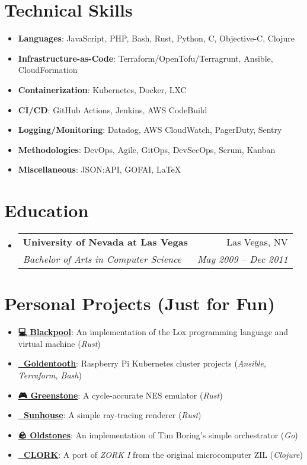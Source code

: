 \documentclass[letterpaper,11pt]{article}
\makeatletter
\newcommand{\resumeSubheading}[4]{
  \vspace{-2pt}\item
    \begin{tabular*}{0.97\textwidth}[t]{l@{\extracolsep{\fill}}r}
      \textbf{#1} & #2 \\
      \textit{\small#3} & \textit{\small #4} \\
    \end{tabular*}\vspace{-7pt}
}
\newcommand{\resumeSubHeadingListStart}{\begin{itemize}[leftmargin=0.15in, label={}]}
\newcommand{\resumeSubHeadingListEnd}{\end{itemize}}
\newenvironment{resumeListicle}{
    \small        %
    \setlength{\itemsep}{0pt}
    \setlength{\parskip}{0pt}
}{}
\newcommand{\resumeListicleStart}{\begin{resumeListicle}}
\newcommand{\resumeListicleEnd}{\end{resumeListicle}}
\newcommand{\resumeListicleItem}[2]{%
  \item \textbf{#1}: #2%
}
\newcommand{\resumeSideProjectListicleItem}[4]{%
  \item \textbf{\href{#1}{#2}}: #3 (\emph{#4})%
}
\makeatother
\begin{document}
\section{Technical Skills}
  \resumeSubHeadingListStart
    \resumeListicleStart
      \resumeListicleItem{Languages}{JavaScript, PHP, Bash, Rust, Python, C, Objective-C, Clojure } \\
      \resumeListicleItem{Infrastructure-as-Code}{Terraform/OpenTofu/Terragrunt, Ansible, CloudFormation } \\
      \resumeListicleItem{Containerization}{Kubernetes, Docker, LXC } \\
      \resumeListicleItem{CI/CD}{GitHub Actions, Jenkins, AWS CodeBuild } \\
      \resumeListicleItem{Logging/Monitoring}{Datadog, AWS CloudWatch, PagerDuty, Sentry } \\
      \resumeListicleItem{Methodologies}{DevOps, Agile, GitOps, DevSecOps, Scrum, Kanban } \\
      \resumeListicleItem{Miscellaneous}{JSON:API, GOFAI, \LaTeX{} } \\
    \resumeListicleEnd
  \resumeSubHeadingListEnd

\section{Education}
  \resumeSubHeadingListStart
    \resumeSubheading
      {University of Nevada at Las Vegas}{Las Vegas, NV}
      {Bachelor of Arts in Computer Science}{May 2009 – Dec 2011}
  \resumeSubHeadingListEnd

\section{Personal Projects (Just for Fun)}
  \resumeSubHeadingListStart
    \resumeListicleStart
      \resumeSideProjectListicleItem{https://github.com/ndouglas/blackpool/}{💻 Blackpool}{An implementation of the Lox programming language and virtual machine}{Rust} \\
      \resumeSideProjectListicleItem{https://github.com/goldentooth/}{🦷 Goldentooth}{Raspberry Pi Kubernetes cluster projects}{Ansible, Terraform, Bash} \\
      \resumeSideProjectListicleItem{https://github.com/ndouglas/greenstone/}{🎮 Greenstone}{A cycle-accurate NES emulator}{Rust} \\
      \resumeSideProjectListicleItem{https://github.com/ndouglas/sunhouse/}{🌈 Sunhouse}{A simple ray-tracing renderer}{Rust} \\
      \resumeSideProjectListicleItem{https://github.com/ndouglas/oldstones/}{🪨 Oldstones}{An implementation of Tim Boring's simple orchestrator}{Go} \\
      \resumeSideProjectListicleItem{https://github.com/ndouglas/clork/}{📜 CLORK}{A port of \emph{ZORK I} from the original microcomputer ZIL}{Clojure} \\
    \resumeListicleEnd
  \resumeSubHeadingListEnd

\end{document}
